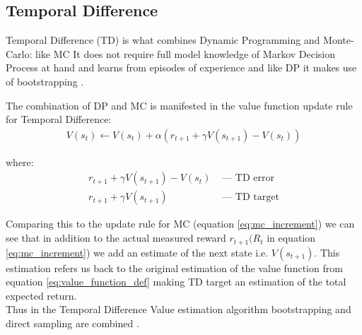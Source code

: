 \subsection{Temporal Difference}

Temporal Difference (TD) is what combines Dynamic Programming and Monte-Carlo: like MC It does not require full model knowledge of Markov Decision Process at hand and 
learns from episodes of experience and like DP it makes use of bootstrapping \cite{lecture_mfl}.


The combination of DP and MC is manifested in the value function update rule for Temporal Difference:
\begin{align}
  V(s_t) \longleftarrow V(s_t) + \alpha (r_{t+1} + \gamma V(s_{t+1}) - V(s_t)) \label{eq:td_update}
\end{align}

where:
\begin{align*}
  r_{t+1} + \gamma V(s_{t+1}) - V(s_t) &\text{ — } \text{TD error}\\
  r_{t+1} + \gamma V(s_{t+1}) &\text { — } \text{TD target}
\end{align*}

Comparing this to the update rule for MC (equation \ref{eq:mc_increment}) we can see that in addition to the actual measured reward $r_{t+1} (R_{t}$ in equation \ref{eq:mc_increment}) we add an estimate of the next state i.e. $V(s_{t+1})$. This estimation refers us back to the original estimation of the value function from equation \ref{eq:value_function_def} making TD target an estimation of the total expected return.\\

Thus in the Temporal Difference Value estimation algorithm
bootstrapping and direct sampling are combined \cite{lecture_mfl}. 

